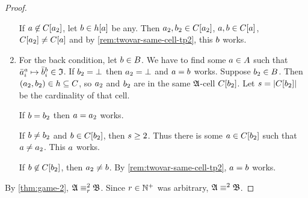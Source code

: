 \begin{proof}
\begin{enumerate}
  If $a \not\in C[a_{2}]$, let $b \in h[a]$ be any.
  Then $a_{2}, b_{2} \in C[a_{2}]$, $a, b \in C[a]$,
  $C[a_{2}] \neq C[a]$ and by \cref{rem:twovar-same-cell-tp2},
  this $b$ works.
  \item For the back condition, let $b \in B$.
  We have to find some $a \in A$ such that
  $\bar{a}_{i}^{a} \mapsto \bar{b}_{i}^{b} \in \mathfrak{I}$.
  If $b_{2} = \bot$ then $a_{2} = \bot$ and $a = b$ works.
  Suppose $b_{2} \in B$. Then $(a_{2},b_{2}) \in h \subseteq C$,
  so $a_{2}$ and $b_{2}$ are in the same $\mathfrak{A}$-cell $C[b_{2}]$.
  Let $s = \left|C[b_{2}]\right|$ be the cardinality of that cell.
  
  If $b = b_{2}$ then $a = a_{2}$ works.
  
  If $b \neq b_{2}$ and $b \in C[b_{2}]$, then $s \geq 2$.
  Thus there is some $a \in C[b_{2}]$ such that $a \neq a_{2}$.
  This $a$ works.
  
  If $b \not\in C[b_{2}]$, then $a_{2} \neq b$.
  By \cref{rem:twovar-same-cell-tp2}, $a = b$ works.
\end{enumerate}
By \cref{thm:game-2}, $\mathfrak{A} \equiv_{r}^{2} \mathfrak{B}$. Since $r \in \mathbb{N}^{+}$
was arbitrary, $\mathfrak{A} \equiv^{2} \mathfrak{B}$.
\end{proof}